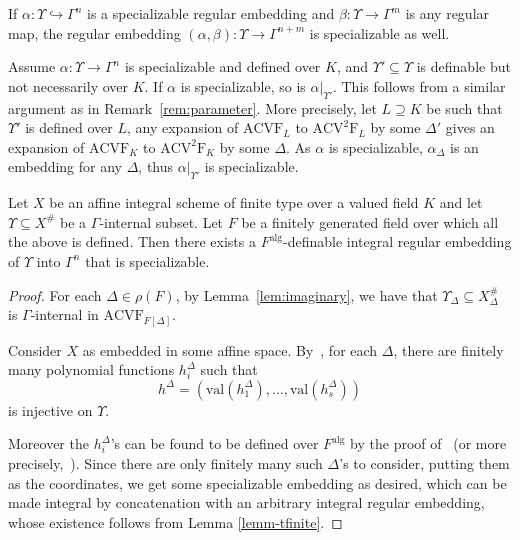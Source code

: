 \documentclass[JEP,XML,SOM,Unicode,ThmDefs,NoEqCountersInSection,published]{cedram}
\newcommand{\val}{\mathrm{val}}
\newcommand{\acvsf}{\mathrm{ACV}^2\mathrm{F}}
\newcommand{\acvf}{\mathrm{ACVF}}
\theoremstyle{plain}
\theoremstyle{definition}
\begin{document}
\begin{rema}
If $\alpha\colon \Upsilon \hookrightarrow \Gamma^n$ is a specializable
regular
embedding and $\beta\colon \Upsilon \to \Gamma^m$ is
any regular map, the
regular embedding $(\alpha,\beta)\colon
\Upsilon\to \Gamma^{n+m}$ is specializable as well.

\end{rema}

\begin{rema}\label{rem:specializable}
Assume $\alpha:\Upsilon\to \Gamma^n$ is specializable and defined over $K$, and $\Upsilon'\subseteq \Upsilon$ is definable but not necessarily over $K$. If $\alpha$ is specializable, so is $\alpha|_{\Upsilon'}$.
This follows from a similar argument as in Remark~\ref{rem:parameter}.
More precisely, let $L\supseteq K$ be such that $\Upsilon'$ is defined over $L$, any expansion of $\acvf_L$ to $\acvsf_L$ by some $\Delta'$ gives an expansion of $\acvf_K$ to $\acvsf_K$ by some $\Delta$. As $\alpha$ is specializable, $\alpha_\Delta$ is an embedding for any $\Delta$, thus $\alpha|_{\Upsilon'}$ is specializable.
\end{rema}

\begin{theo}\label{thm:existence}
Let $X$ be an affine integral scheme of finite type over a valued field $K$ and let $\Upsilon\subseteq X^{\#}$ be a $\Gamma$-internal subset. Let $F$ be
a finitely generated field over which all the above is defined.
Then there exists a $F^\mathrm{alg}$-definable integral regular embedding of $\Upsilon$ into $\Gamma^n$ that is specializable.
\end{theo}
\begin{proof}
For each $\Delta\in \rho(F)$, by Lemma~\ref{lem:imaginary}, we have that $\Upsilon_\Delta\subseteq X^{\#}_\Delta$ is $\Gamma$-internal in $\acvf_{F[\Delta]}$.

Consider $X$ as embedded in some affine space.
By~\cite[Cor.\,6.2.5]{HL}, for each $\Delta$, there are finitely many polynomial functions $h^\Delta_i $ such that
\[
h^\Delta=(\val(h_1^\Delta),\ldots,\val(h_s^\Delta))
\]
is injective on $\Upsilon$.

Moreover the $h^\Delta_i$'s can be found to be defined over $F^\mathrm{alg}$ by the
proof of~\cite[Cor.\,6.2.5]{HL} (or more precisely,~\cite[Lem.\,6.2.2]{HL}). Since there are only finitely many such $\Delta$'s to consider,
putting them as the coordinates,
we get some specializable embedding as desired,
which
can be made integral by concatenation with an arbitrary integral regular embedding, whose existence
follows from Lemma \ref{lemm-tfinite}.
\end{proof}
\end{document}
